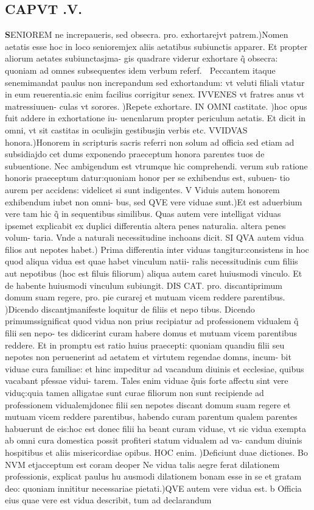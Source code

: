 \documentclass{article}
\begin{document}
\begin{pages}
\endnumbering\beginnumbering\section{CAPVT .V.}\pstart \huge\textbf{S}\normalsize ENIOREM ne increpaueris, sed obsecra. pro. exhortarejvt patrem.)Nomen aetatis esse hoc in loco senioremjex aliis aetatibus subiunctis apparer. Et propter aliorum aetates subiunctasjma- gis quadrare viderur exhortare q̃ obsecra: quoniam ad omnes subsequentes idem verbum referf.  Peccantem itaque senemimandat paulus non increpandum sed exhortandum: vt veluti filiali vtatur in eum reuerentia.sic enim facilius corrigitur senex. IVVENES vt fratres anus vt matressiuuen- culas vt sorores. )Repete exhortare. IN OMNI castitate. )hoc opus fuit addere in exhortatione iu- uencnlarum propter periculum aetatis. Et dicit in omni, vt sit castitas in oculisjin gestibusjin verbis etc. VVIDVAS honora.)Honorem in scripturis sacris referri non solum ad officia sed etiam ad subsidiajdo cet dums exponendo praeceptum honora parentes tuos de subuentione. Nec ambigendum est vtrumque hic comprehendi. verum sub ratione honoris praeceptum datur:quoniam honor per se exhibendus est, subuen- tio aurem per accidens: videlicet si sunt indigentes. V Viduis autem honorem exhibendum iubet non omni- bus, sed QVE vere viduae sunt.)Et est aduerbium vere tam hic q̃ in sequentibus similibus. Quas autem vere intelligat viduas ipsemet explicabit ex duplici differentia altera penes naturalia. altera penes volum- taria. Vnde a naturali necessitudine inchoans dicit. SI QVA autem vidua filios aut nepotes habet.) Prima differentia inter viduas tangitur:consistens in hoc quod aliqua vidua est quae habet vinculum natii- ralis necessitudinis cum filiis aut nepotibus (hoc est filuis filiorum) aliqua autem caret huiusmodi vinculo. Et de habente huiusmodi vinculum subiungit. DIS CAT. pro. discantiprimum domum suam regere, pro. pie curarej et mutuam vicem reddere parentibus. )Dicendo discantjmanifeste loquitur de filiis et nepo tibus. Dicendo primumssignificat quod vidua non prius recipiatur ad professionem vidualem q̃ filii sen nepo- tes didicerint curam habere domus et mutuam vicem parentibus reddere. Et in promptu est ratio huius praecepti: quoniam quandiu filii seu nepotes non peruenerint ad aetatem et virtutem regendae domns, incum- bit viduae cura familiae: et hinc impeditur ad vacandum diuinis et ecclesiae, quibus vacabant pfessae vidui- tarem. Tales enim viduae q̃uis forte affectu sint vere viduç:quia tamen alligatae sunt curae filiorum non sunt recipiende ad professionem vidualemjdonec filii sen nepotes discant domum suam regere et mutuam vicem reddere parentibus, habendo curam parentum qualem parentes habuerunt de eis:hoc est donec filii ha beant curam viduae, vt sic vidua exempta ab omni cura domestica possit profiteri statum vidualem ad va- candum diuinis hospitibus et aliis misericordiae opibus. HOC enim. )Deficiunt duae dictiones. Bo NVM etjacceptum est coram deoper Ne vidua talis aegre ferat dilationem professionis, explicat paulus hu ausmodi dilationem bonam esse in se et gratam deo: quoniam innititur necessariae pietati.)QVE autem vere vidua est. b Officia eius quae vere est vidua describit, tum ad declarandum 
\end{pages}
\end{document}
